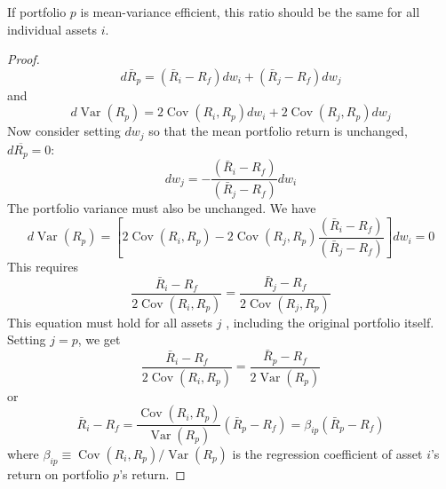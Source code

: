 \documentclass[11pt,green,twocol,citestyle=authoryear, bibstyle=authoryear]{elegantbook}
\begin{document}
\begin{proposition}
    If portfolio $ p $  is mean-variance efficient, this ratio should be the same for all individual assets $ i $.
\end{proposition}
\begin{proof}
    \begin{equation}\label{equ:3.5}
        d \bar{R}_p=\left(\bar{R}_i-R_f\right) d w_i+\left(\bar{R}_j-R_f\right) d w_j
    \end{equation}
    and
    \begin{equation}\label{equ:3.6}
        d \operatorname{Var}\left(R_p\right)=2 \operatorname{Cov}\left(R_i, R_p\right) d w_i+2 \operatorname{Cov}\left(R_j, R_p\right) d w_j
    \end{equation}
    Now consider setting $ dw_j $ so that the mean portfolio return is unchanged, $ d\overline{R_p} = 0 $:
    \begin{equation}\label{equ:3.7}
        d w_j=-\frac{\left(\bar{R}_i-R_f\right)}{\left(\bar{R}_j-R_f\right)} d w_i
    \end{equation}  
    The portfolio variance must also be unchanged. We have
    \begin{equation}\label{equ:3.8}
        d \operatorname{Var}\left(R_p\right)=\left[2 \operatorname{Cov}\left(R_i, R_p\right)-2 \operatorname{Cov}\left(R_j, R_p\right) \frac{\left(\bar{R}_i-R_f\right)}{\left(\bar{R}_j-R_f\right)}\right] d w_i=0
    \end{equation}
    This requires
    \begin{equation}\label{equ:3.9}
        \frac{\bar{R}_i-R_f}{2 \operatorname{Cov}\left(R_i, R_p\right)}=\frac{\bar{R}_j-R_f}{2 \operatorname{Cov}\left(R_j, R_p\right)}
    \end{equation}
    This equation must hold for all assets $ j $ , including the original portfolio itself. Setting
    $ j = p $, we get
    \begin{equation}\label{equ:3.10}
        \frac{\bar{R}_i-R_f}{2 \operatorname{Cov}\left(R_i, R_p\right)}=\frac{\bar{R}_p-R_f}{2 \operatorname{Var}\left(R_p\right)}
    \end{equation}
    or
    \begin{equation}\label{equ:3.11}
        \bar{R}_i-R_f=\frac{\operatorname{Cov}\left(R_i, R_p\right)}{\operatorname{Var}\left(R_p\right)}\left(\bar{R}_p-R_f\right)=\beta_{i p}\left(\bar{R}_p-R_f\right)
    \end{equation}
    where $ \beta_{i p} \equiv \operatorname{Cov}\left(R_i, R_p\right) / \operatorname{Var}\left(R_p\right) $ is the regression coefficient of asset $ i $'s return on portfolio $ p $'s return.
\end{proof}
\end{document}
